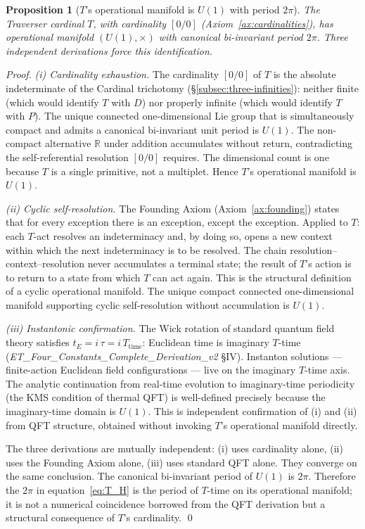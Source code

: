 \documentclass[11pt,a4paper]{article}
\newtheorem{proposition}[theorem]{Proposition}
\theoremstyle{definition}
\theoremstyle{remark}
\begin{document}
\begin{proposition}[$T$'s operational manifold is $U(1)$ with period $2\pi$]\label{prop:U1-period}
The Traverser cardinal $T$, with cardinality $[0/0]$ (Axiom~\ref{ax:cardinalities}), has operational manifold $(U(1),\times)$ with canonical bi-invariant period $2\pi$. Three independent derivations force this identification.
\end{proposition}

\begin{proof}
\emph{(i) Cardinality exhaustion.} The cardinality $[0/0]$ of $T$ is the absolute indeterminate of the Cardinal trichotomy (\S\ref{subsec:three-infinities}): neither finite (which would identify $T$ with $D$) nor properly infinite (which would identify $T$ with $P$). The unique connected one-dimensional Lie group that is simultaneously compact and admits a canonical bi-invariant unit period is $U(1)$. The non-compact alternative $\mathbb{R}$ under addition accumulates without return, contradicting the self-referential resolution $[0/0]$ requires. The dimensional count is one because $T$ is a single primitive, not a multiplet. Hence $T$'s operational manifold is $U(1)$.

\emph{(ii) Cyclic self-resolution.} The Founding Axiom (Axiom~\ref{ax:founding}) states that for every exception there is an exception, except the exception. Applied to $T$: each $T$-act resolves an indeterminacy and, by doing so, opens a new context within which the next indeterminacy is to be resolved. The chain resolution--context--resolution never accumulates a terminal state; the result of $T$'s action is to return to a state from which $T$ can act again. This is the structural definition of a cyclic operational manifold. The unique compact connected one-dimensional manifold supporting cyclic self-resolution without accumulation is $U(1)$.

\emph{(iii) Instantonic confirmation.} The Wick rotation of standard quantum field theory satisfies $t_{E} = i\,\tau = i\,T_{\text{time}}$: Euclidean time is imaginary $T$-time (\textit{ET\_\allowbreak Four\_\allowbreak Constants\_\allowbreak Complete\_\allowbreak Derivation\_v2} \S IV). Instanton solutions --- finite-action Euclidean field configurations --- live on the imaginary $T$-time axis. The analytic continuation from real-time evolution to imaginary-time periodicity (the KMS condition of thermal QFT) is well-defined precisely because the imaginary-time domain is $U(1)$. This is independent confirmation of (i) and (ii) from QFT structure, obtained without invoking $T$'s operational manifold directly.

The three derivations are mutually independent: (i) uses cardinality alone, (ii) uses the Founding Axiom alone, (iii) uses standard QFT alone. They converge on the same conclusion. The canonical bi-invariant period of $U(1)$ is $2\pi$. Therefore the $2\pi$ in equation~\eqref{eq:T_H} is the period of $T$-time on its operational manifold; it is not a numerical coincidence borrowed from the QFT derivation but a structural consequence of $T$'s cardinality. \qed
\end{proof}
\end{document}
